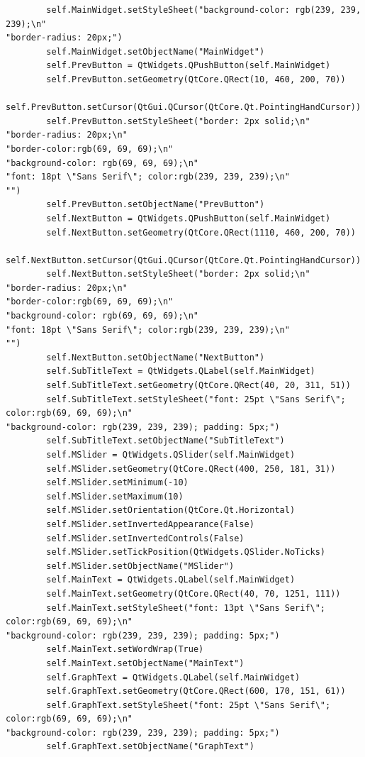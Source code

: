 \documentclass[12pt]{article}
\begin{document}
\begin{lstlisting}
        self.MainWidget.setStyleSheet("background-color: rgb(239, 239, 239);\n"
"border-radius: 20px;")
        self.MainWidget.setObjectName("MainWidget")
        self.PrevButton = QtWidgets.QPushButton(self.MainWidget)
        self.PrevButton.setGeometry(QtCore.QRect(10, 460, 200, 70))
        self.PrevButton.setCursor(QtGui.QCursor(QtCore.Qt.PointingHandCursor))
        self.PrevButton.setStyleSheet("border: 2px solid;\n"
"border-radius: 20px;\n"
"border-color:rgb(69, 69, 69);\n"
"background-color: rgb(69, 69, 69);\n"
"font: 18pt \"Sans Serif\"; color:rgb(239, 239, 239);\n"
"")
        self.PrevButton.setObjectName("PrevButton")
        self.NextButton = QtWidgets.QPushButton(self.MainWidget)
        self.NextButton.setGeometry(QtCore.QRect(1110, 460, 200, 70))
        self.NextButton.setCursor(QtGui.QCursor(QtCore.Qt.PointingHandCursor))
        self.NextButton.setStyleSheet("border: 2px solid;\n"
"border-radius: 20px;\n"
"border-color:rgb(69, 69, 69);\n"
"background-color: rgb(69, 69, 69);\n"
"font: 18pt \"Sans Serif\"; color:rgb(239, 239, 239);\n"
"")
        self.NextButton.setObjectName("NextButton")
        self.SubTitleText = QtWidgets.QLabel(self.MainWidget)
        self.SubTitleText.setGeometry(QtCore.QRect(40, 20, 311, 51))
        self.SubTitleText.setStyleSheet("font: 25pt \"Sans Serif\"; color:rgb(69, 69, 69);\n"
"background-color: rgb(239, 239, 239); padding: 5px;")
        self.SubTitleText.setObjectName("SubTitleText")
        self.MSlider = QtWidgets.QSlider(self.MainWidget)
        self.MSlider.setGeometry(QtCore.QRect(400, 250, 181, 31))
        self.MSlider.setMinimum(-10)
        self.MSlider.setMaximum(10)
        self.MSlider.setOrientation(QtCore.Qt.Horizontal)
        self.MSlider.setInvertedAppearance(False)
        self.MSlider.setInvertedControls(False)
        self.MSlider.setTickPosition(QtWidgets.QSlider.NoTicks)
        self.MSlider.setObjectName("MSlider")
        self.MainText = QtWidgets.QLabel(self.MainWidget)
        self.MainText.setGeometry(QtCore.QRect(40, 70, 1251, 111))
        self.MainText.setStyleSheet("font: 13pt \"Sans Serif\"; color:rgb(69, 69, 69);\n"
"background-color: rgb(239, 239, 239); padding: 5px;")
        self.MainText.setWordWrap(True)
        self.MainText.setObjectName("MainText")
        self.GraphText = QtWidgets.QLabel(self.MainWidget)
        self.GraphText.setGeometry(QtCore.QRect(600, 170, 151, 61))
        self.GraphText.setStyleSheet("font: 25pt \"Sans Serif\"; color:rgb(69, 69, 69);\n"
"background-color: rgb(239, 239, 239); padding: 5px;")
        self.GraphText.setObjectName("GraphText")

\end{lstlisting}
\end{document}
